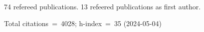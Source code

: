 74 refereed publications. 13 refeered publications as first author.

Total citations~=~4028; h-index~=~35 (2024-05-04)